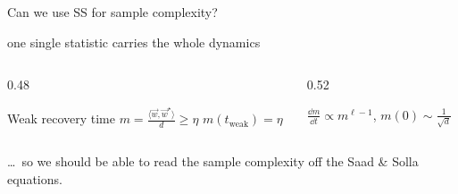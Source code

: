 \documentclass[aspectratio=169,11pt]{beamer}
\begin{document}
\begin{frame}{Can we use SS for sample complexity?}
  \begin{center}
    \quad
    {\large one single statistic carries the whole dynamics}
  \end{center}
  \vspace{-0.2em}
  \vspace{0.2em}
  \begin{columns}[c]
    \begin{column}{0.48\textwidth}
      \begin{defbox}[top=3pt, bottom=2pt]{Weak recovery time}
        \centering
        $\displaystyle m = \frac{\langle \vec{w}, \vec{w}^\star\rangle}{d}
          \geq \eta$
        \qquad
        $m(t_{\mathrm{weak}}) = \eta$
      \end{defbox}
    \end{column}
    \pause
    \begin{column}{0.52\textwidth}
      \centering
      \par\vspace{0.35em}
      \quad
      $\displaystyle \frac{\dd m}{\dd t} \propto m^{\ell-1}$,\quad
      $\displaystyle m(0) \sim \frac{1}{\sqrt{d}}$
    \end{column}
  \end{columns}
  \vspace{0.5em}
  \begin{center}
    \large \dots\ so we should be able to read the sample complexity off the
    Saad \& Solla equations.
  \end{center}
  \vspace{0.3em}
  \pause
  \vspace{0.2em}

\end{frame}
\end{document}
